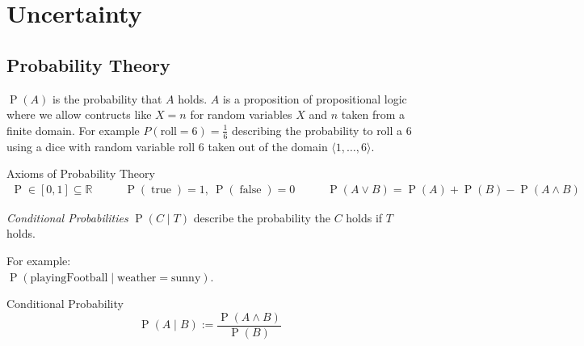 \documentclass[english]{panikzettel}
\begin{document}
\newpage
\section{Uncertainty}
\subsection{Probability Theory}
$\operatorname{P}(A)$ is the probability that $A$ holds. $A$ is a proposition of propositional logic where we allow contructs like $X=n$ for random variables $X$ and $n$ taken from a finite domain. For example $P(\text{roll}=6) = \frac{1}{6}$ describing the probability to roll a 6 using a dice with random variable roll $6$ taken out of the domain $\langle 1,\dots,6\rangle$.

\begin{defi}{Axioms of Probability Theory}
\small
\[ \begin{array}{lcr}
    \operatorname{P} \in [0,1] \subseteq \mathbb{R}\qquad & \operatorname{P}(\operatorname{true}) = 1,~ \operatorname{P}(\operatorname{false}) = 0 & \qquad\operatorname{P}(A \lor B) = \operatorname{P}(A) + \operatorname{P}(B) - \operatorname{P}(A \land B)
\end{array} \]
\end{defi}
\medskip

\begin{halfboxl}
\emph{Conditional Probabilities} $\operatorname{P} (C\mid T)$ describe the probability the $C$ holds if $T$ holds.

For example: \\
$\operatorname{P} (\text{playingFootball} \mid \text{weather}=\text{sunny})$.
\end{halfboxl}%
\begin{halfboxr}
\vspace{-\baselineskip}
\begin{defi}{Conditional Probability}
\[\operatorname P (A\mid B) := \frac{\operatorname{P}(A\land B)}{\operatorname{P} (B)}\]
\end{defi}
\end{halfboxr}
\medskip
\end{document}
